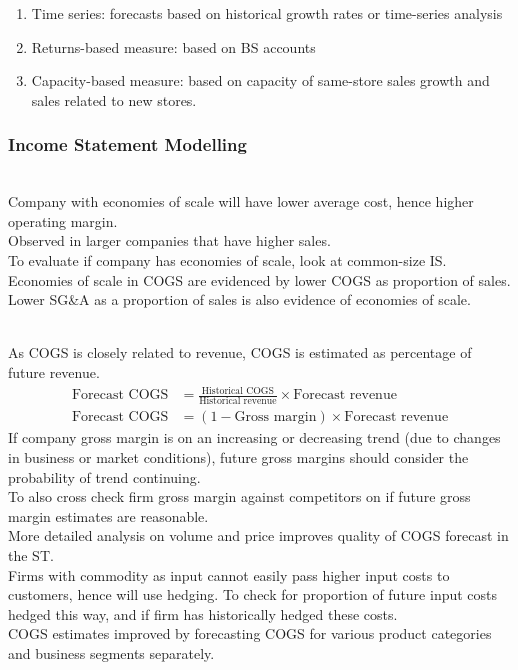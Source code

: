 \begin{method} 
\begin{enumerate}[label=\roman*.]
\setlength{\itemsep}{0pt}
\item Time series: forecasts based on historical growth rates or time-series analysis
\item Returns-based measure: based on BS accounts
\item Capacity-based measure: based on capacity of same-store sales growth and sales related to new stores.
\end{enumerate}
\end{method}

\subsubsection{Income Statement Modelling}

\begin{remark} \\
Company with economies of scale will have lower average cost, hence higher operating margin.\\
Observed in larger companies that have higher sales.\\
To evaluate if company has economies of scale, look at common-size IS.\\
Economies of scale in COGS are evidenced by lower COGS as proportion of sales. Lower SG\&A as a proportion of sales is also evidence of economies of scale.
\end{remark}

\begin{remark} \\
As COGS is closely related to revenue, COGS is estimated as percentage of future revenue.
\begin{align}
\text{Forecast COGS} &= \frac{\text{Historical COGS}}{\text{Historical revenue}} \times \text{Forecast revenue} \nonumber \\
\text{Forecast COGS} &= (1 - \text{Gross margin}) \times \text{Forecast revenue} \nonumber
\end{align}
If company gross margin is on an increasing or decreasing trend (due to changes in business or market conditions), future gross margins should consider the probability of trend continuing.\\
To also cross check firm gross margin against competitors on if future gross margin estimates are reasonable.\\
More detailed analysis on volume and price improves quality of COGS forecast in the ST.\\
Firms with commodity as input cannot easily pass higher input costs to customers, hence will use hedging. To check for proportion of future input costs hedged this way, and if firm has historically hedged these costs. \\
COGS estimates improved by forecasting COGS for various product categories and business segments separately.
\end{remark}

